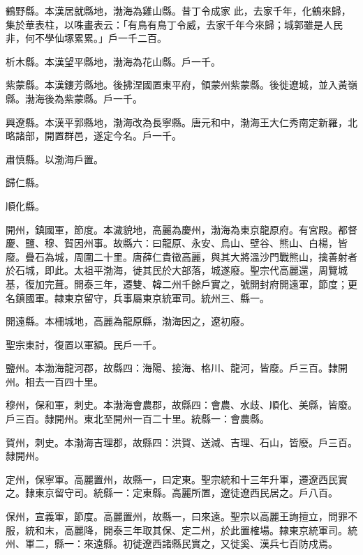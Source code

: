 \begin{pinyinscope}
 鶴野縣。本漢居就縣地，渤海為雞山縣。昔丁令成家
 此，去家千年，化鶴來歸，集於華表柱，以咮畫表云：「有鳥有鳥丁令威，去家千年今來歸；城郭雖是人民非，何不學仙塚累累。」戶一千二百。



 析木縣。本漢望平縣地，渤海為花山縣。戶一千。



 紫蒙縣。本漢鏤芳縣地。後拂涅國置東平府，領蒙州紫蒙縣。後徙遼城，並入黃嶺縣。渤海後為紫蒙縣。戶一千。



 興遼縣。本漢平郭縣地，渤海改為長寧縣。唐元和中，渤海王大仁秀南定新羅，北略諸部，開置群邑，遂定今名。戶一千。



 肅慎縣。以渤海戶置。



 歸仁縣。



 順化縣。



 開州，鎮國軍，節度。本濊貌地，高麗為慶州，渤海為東京龍原府。有宮殿。都督慶、鹽、穆、賀因州事。故縣六：曰龍原、永安、烏山、壁谷、熊山、白楊，皆廢。疊石為城，周圍二十里。唐薛仁貴徵高麗，與其大將溫沙門戰熊山，擒善射者於石城，即此。太祖平渤海，徙其民於大部落，城遂廢。聖宗代高麗還，周覽城基，復加完葺。開泰三年，遷雙、韓二州千餘戶實之，號開封府開遠軍，節度；更名鎮國軍。隸東京留守，兵事屬東京統軍司。統州三、縣一。



 開遠縣。本柵城地，高麗為龍原縣，渤海因之，遼初廢。



 聖宗東討，復置以軍額。民戶一千。



 鹽州。本渤海龍河郡，故縣四：海陽、接海、格川、龍河，皆廢。戶三百。隸開州。相去一百四十里。



 穆州，保和軍，刺史。本渤海會農郡，故縣四：會農、水歧、順化、美縣，皆廢。戶三百。隸開州。東北至開州一百二十里。統縣一：會農縣。



 賀州，刺史。本渤海吉理郡，故縣四：洪賀、送減、吉理、石山，皆廢。戶三百。隸開州。



 定州，保寧軍。高麗置州，故縣一，曰定東。聖宗統和十三年升軍，遷遼西民實之。隸東京留守司。統縣一：定東縣。高麗所置，遼徒遼西民居之。戶八百。



 保州，宣義軍，節度。高麗置州，故縣一，曰來遠。聖宗以高麗王詢擅立，問罪不服，統和末，高麗降，開泰三年取其保、定二州，於此置榷場。隸東京統軍司。統州、軍二，縣一：來遠縣。初徙遼西諸縣民實之，又徙奚、漢兵七百防戍焉。




\end{pinyinscope}
